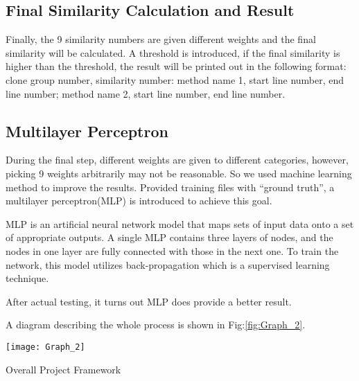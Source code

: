 \documentclass[../main.tex]{subfiles}
\begin{document}
\subsection{Final Similarity Calculation and Result}

Finally, the 9 similarity numbers are given different weights and the final similarity will be calculated. A threshold is introduced, if the final similarity is higher than the threshold, the result will be printed out in the following format: clone group number, similarity number: method name 1, start line number, end line number; method name 2, start line number, end line number.


\subsection{Multilayer Perceptron}

During the final step, different weights are given to different categories, however, picking 9 weights arbitrarily may not be reasonable. So we used machine learning method to improve the results. Provided training files with ``ground truth'', a multilayer perceptron(MLP) is introduced to achieve this goal. 

MLP is an artificial neural network model that maps sets of input data onto a set of appropriate outputs. A single MLP contains three layers of nodes, and the nodes in one layer are fully connected with those in the next one. To train the network, this model utilizes back-propagation which is a supervised learning technique.

After actual testing, it turns out MLP does provide a better result.

A diagram describing the whole process is shown in Fig:\ref{fig:Graph_2}.\\

\begin{figurehere}
\centering \texttt{[image: Graph\_2]} 
\caption{Overall Project Framework} \label{fig:Graph_2}
\end{figurehere}
\end{document}
